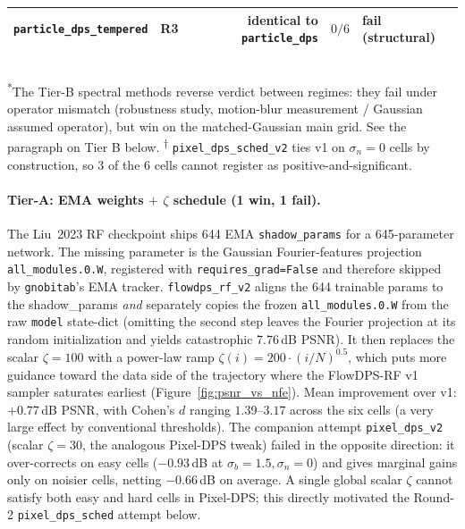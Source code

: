 \documentclass{article}
\begin{document}
\begin{table}[h]
\begin{tabular}{llrrl}
    \texttt{particle\_dps\_tempered}                  & R3 & identical to \texttt{particle\_dps} & $0/6$ & fail (structural) \\
    \bottomrule
  \end{tabular}
  \\[0.4em]
  \footnotesize \textsuperscript{*}The Tier-B spectral methods reverse
  verdict between regimes: they fail under operator mismatch
  (robustness study, motion-blur measurement / Gaussian assumed
  operator), but win on the matched-Gaussian main grid. See the
  paragraph on Tier B below. \textsuperscript{$\dagger$}
  \texttt{pixel\_dps\_sched\_v2} ties v1 on $\sigma_n{=}0$ cells by
  construction, so 3 of the 6 cells cannot register as
  positive-and-significant.
\end{table}

\paragraph{Tier-A: EMA weights $+$ $\zeta$ schedule (1 win, 1 fail).}
The Liu~2023 RF checkpoint ships 644 EMA \texttt{shadow\_params} for a
645-parameter network. The missing parameter is the Gaussian
Fourier-features projection \texttt{all\_modules.0.W}, registered with
\texttt{requires\_grad=False} and therefore skipped by
\texttt{gnobitab}'s EMA tracker. \texttt{flowdps\_rf\_v2} aligns the
644 trainable params to the shadow\_params \emph{and} separately
copies the frozen \texttt{all\_modules.0.W} from the raw \texttt{model}
state-dict (omitting the second step leaves the Fourier projection at
its random initialization and yields catastrophic 7.76\,dB PSNR). It
then replaces the scalar $\zeta{=}100$ with a power-law ramp
$\zeta(i) = 200 \cdot (i/N)^{0.5}$, which puts more guidance toward
the data side of the trajectory where the FlowDPS-RF v1 sampler
saturates earliest (Figure~\ref{fig:psnr_vs_nfe}). Mean improvement
over v1: $\boldsymbol{+0.77}$\,dB PSNR, with Cohen's $d$ ranging
$1.39$--$3.17$ across the six cells (a very large effect by
conventional thresholds). The companion attempt \texttt{pixel\_dps\_v2}
(scalar $\zeta = 30$, the analogous Pixel-DPS tweak) failed in the
opposite direction: it over-corrects on easy cells
($-0.93$\,dB at $\sigma_b{=}1.5,\sigma_n{=}0$) and gives marginal
gains only on noisier cells, netting $-0.66$\,dB on average. A single
global scalar $\zeta$ cannot satisfy both easy and hard cells in
Pixel-DPS; this directly motivated the Round-2 \texttt{pixel\_dps\_sched}
attempt below.
\end{document}
